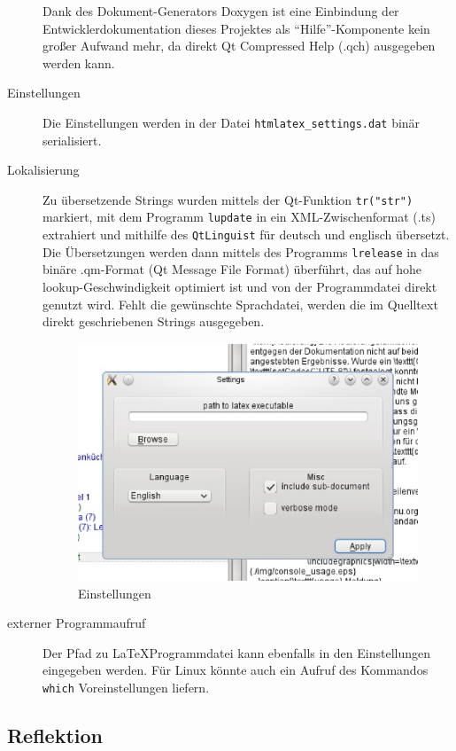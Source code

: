 \documentclass[	a4paper,		%
		titlepage, 		%
		fontsize=12pt		%
		]{scrartcl} 		%
\begin{document}
\begin{description}
Dank des Dokument-Generators Doxygen ist eine Einbindung der Entwicklerdokumentation dieses Projektes als ``Hilfe''-Komponente kein großer Aufwand mehr, da direkt Qt Compressed Help (.qch) ausgegeben werden kann.

 \item[Einstellungen] Die Einstellungen werden in der Datei \texttt{htmlatex\_settings.dat} binär serialisiert.

 \item[Lokalisierung] Zu übersetzende Strings wurden mittels der Qt-Funktion \texttt{tr("str")}  markiert, mit dem Programm \texttt{lupdate} in ein XML-Zwischenformat (.ts) extrahiert und mithilfe des \texttt{QtLinguist} für deutsch und englisch übersetzt. Die Übersetzungen werden dann mittels des Programms \texttt{lrelease} in das binäre .qm-Format (Qt Message File Format) überführt, das auf hohe lookup-Ge\-schwin\-dig\-keit optimiert ist und von der Programmdatei direkt genutzt wird. Fehlt die gewünschte Sprachdatei, werden die im Quelltext direkt geschriebenen Strings ausgegeben.
  \begin{figure} [H]
    \centering
	\includegraphics[width=.5\textwidth, keepaspectratio]{./img/GUI_settings.eps}
    \caption{Einstellungen}
\end{figure}

\item[externer Programmaufruf]
Der Pfad zu \LaTeX Programmdatei kann ebenfalls in den Einstellungen eingegeben werden.
Für Linux könnte auch ein Aufruf des Kommandos \texttt{which} Voreinstellungen liefern.

 \end{description}

\subsection{Reflektion}
\end{document}

